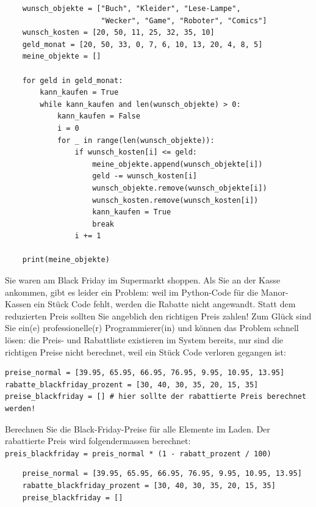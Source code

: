 \begin{questions}
\begin{solution}
    \begin{lstlisting}
    wunsch_objekte = ["Buch", "Kleider", "Lese-Lampe",
                      "Wecker", "Game", "Roboter", "Comics"]
    wunsch_kosten = [20, 50, 11, 25, 32, 35, 10]
    geld_monat = [20, 50, 33, 0, 7, 6, 10, 13, 20, 4, 8, 5]
    meine_objekte = []

    for geld in geld_monat:
        kann_kaufen = True
        while kann_kaufen and len(wunsch_objekte) > 0:
            kann_kaufen = False
            i = 0
            for _ in range(len(wunsch_objekte)):
                if wunsch_kosten[i] <= geld:
                    meine_objekte.append(wunsch_objekte[i])
                    geld -= wunsch_kosten[i]
                    wunsch_objekte.remove(wunsch_objekte[i])
                    wunsch_kosten.remove(wunsch_kosten[i])
                    kann_kaufen = True
                    break
                i += 1

    print(meine_objekte)
    \end{lstlisting}

  \end{solution}

\clearpage
{}

Sie waren am Black Friday im Supermarkt shoppen. Als Sie an der Kasse ankommen, gibt es leider ein Problem: weil im Python-Code für die Manor-Kassen ein Stück Code fehlt, werden die Rabatte nicht angewandt. Statt dem reduzierten Preis sollten Sie angeblich den richtigen Preis zahlen! Zum Glück sind Sie ein(e) professionelle(r) Programmierer(in) und können das Problem schnell lösen: die Preis- und Rabattliste existieren im System bereits, nur sind die richtigen Preise nicht berechnet, weil ein Stück Code verloren gegangen ist:
\begin{lstlisting}
preise_normal = [39.95, 65.95, 66.95, 76.95, 9.95, 10.95, 13.95]
rabatte_blackfriday_prozent = [30, 40, 30, 35, 20, 15, 35]
preise_blackfriday = [] # hier sollte der rabattierte Preis berechnet werden!
\end{lstlisting}
Berechnen Sie die Black-Friday-Preise für alle Elemente im Laden. Der rabattierte Preis wird folgendermassen berechnet:\\
	\lstinline|preis_blackfriday = preis_normal * (1 - rabatt_prozent / 100)|
	\begin{solution}
    \begin{lstlisting}
    preise_normal = [39.95, 65.95, 66.95, 76.95, 9.95, 10.95, 13.95]
    rabatte_blackfriday_prozent = [30, 40, 30, 35, 20, 15, 35]
    preise_blackfriday = []


\end{lstlisting}
\end{solution}
\end{questions}
